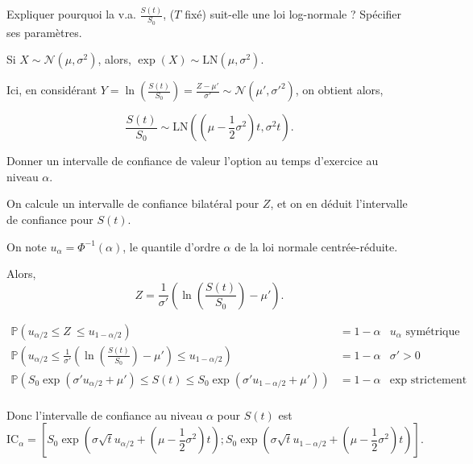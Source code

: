 \documentclass[answers, 10pt]{exam}
\begin{document}
\begin{questions}
\begin{solutionorbox}
	\end{solutionorbox}

	\question
	Expliquer pourquoi la v.a. $\frac{S(t)}{S_0}$, ($T$ fixé) suit-elle une
	loi log-normale ? Spécifier ses paramètres.
	
	\begin{solutionorbox}
		Si $X\sim \mathcal{N}(\mu, \sigma^2)$, alors, $\exp(X)\sim
		\text{LN}(\mu, \sigma^2)$.

		Ici, en considérant $Y =\ln \left( \frac{S(t)}{S_0} \right) = 
		\frac{Z - \mu'}{\sigma'}\sim \mathcal{N}(\mu', \sigma'^2)$, 
		on obtient alors,

		\[
			\frac{S(t)}{S_0}\sim \text{LN}\left( 
			\left( \mu - \frac{1}{2}\sigma^2 \right)t, \sigma^2 t
			\right)
		.\] 


	\end{solutionorbox}

	\question
	Donner un intervalle de confiance de valeur l'option au temps
	d'exercice au niveau $\alpha$.

	\begin{solutionorbox}
		On calcule un intervalle de confiance bilatéral pour $Z$, et on
		en déduit l'intervalle de confiance pour $S(t)$.

		On note $u_{\alpha} = \Phi^{-1}(\alpha)$, le quantile d'ordre
		$\alpha$ de la loi normale centrée-réduite.

		Alors,
		\[
			Z = \frac{1}{\sigma'} \left( 
				\ln\left( \frac{S(t)}{S_0}\right) - \mu' 
			\right)
		.\] 

		\begin{align*}
			\mathbb{P}\left( u_{\alpha / 2} \leq Z \ \leq u_{1 - \alpha / 2} \right) &= 1 - \alpha & u_\alpha \text{ symétrique}\\
			\mathbb{P}\left( u_{\alpha / 2} \leq \frac{1}{\sigma'}\left( \ln\left( \frac{S(t)}{S_0}\right) - \mu' \right) \leq u_{1 - \alpha / 2} \right) &= 1 - \alpha & \sigma' > 0\\
			\mathbb{P}\left( S_0\exp\left(\sigma'u_{\alpha / 2} + \mu'\right) \leq S(t) \leq S_0\exp\left(\sigma'u_{1 - \alpha / 2} + \mu'\right) \right) &= 1 - \alpha & \exp\text{ strictement croissante}\\
		\end{align*}

		Donc l'intervalle de confiance au niveau $\alpha$ pour $S(t)$ est \[
			\text{IC}_\alpha = \left[ S_0\exp\left(\sigma\sqrt{t}u_{\alpha / 2} + \left( \mu - \frac{1}{2} \sigma^2 \right)t\right); S_0\exp\left(\sigma\sqrt{t}u_{1 - \alpha / 2} + \left( \mu - \frac{1}{2} \sigma^2 \right)t\right)\right]
		.\] 
	\end{solutionorbox}


\end{questions}
\end{document}
